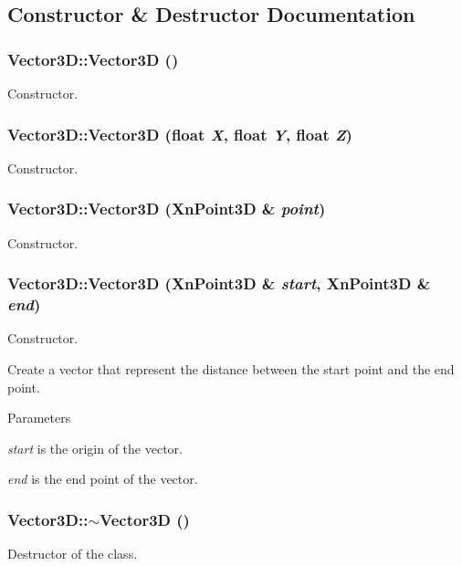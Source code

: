 \subsection{Constructor \& Destructor Documentation}
\hypertarget{classVector3D_a0b11a8d75da427b27443d8a94d0d296c}{
\subsubsection[{Vector3D}]{\setlength{\rightskip}{0pt plus 5cm}Vector3D::Vector3D ()}}
\label{classVector3D_a0b11a8d75da427b27443d8a94d0d296c}
Constructor. \hypertarget{classVector3D_a78942f6189eb0d5fbf0807b618989dc7}{
\subsubsection[{Vector3D}]{\setlength{\rightskip}{0pt plus 5cm}Vector3D::Vector3D (float {\em X}, \/  float {\em Y}, \/  float {\em Z})}}
\label{classVector3D_a78942f6189eb0d5fbf0807b618989dc7}
Constructor. \hypertarget{classVector3D_ac20c5842aab3efc1849fa8574f0dc4ff}{
\subsubsection[{Vector3D}]{\setlength{\rightskip}{0pt plus 5cm}Vector3D::Vector3D (XnPoint3D \& {\em point})}}
\label{classVector3D_ac20c5842aab3efc1849fa8574f0dc4ff}
Constructor. \hypertarget{classVector3D_affff1bab0dfa4dba55acd5cadafb5fcc}{
\subsubsection[{Vector3D}]{\setlength{\rightskip}{0pt plus 5cm}Vector3D::Vector3D (XnPoint3D \& {\em start}, \/  XnPoint3D \& {\em end})}}
\label{classVector3D_affff1bab0dfa4dba55acd5cadafb5fcc}
Constructor.

Create a vector that represent the distance between the start point and the end point.


\begin{DoxyParams}{Parameters}
\item[{\em start}]is the origin of the vector. \item[{\em end}]is the end point of the vector. \end{DoxyParams}
\hypertarget{classVector3D_ae4fde5759270bf5bcf615f12f0823a8c}{
\subsubsection[{$\sim$Vector3D}]{\setlength{\rightskip}{0pt plus 5cm}Vector3D::$\sim$Vector3D ()}}
\label{classVector3D_ae4fde5759270bf5bcf615f12f0823a8c}
Destructor of the class. 

